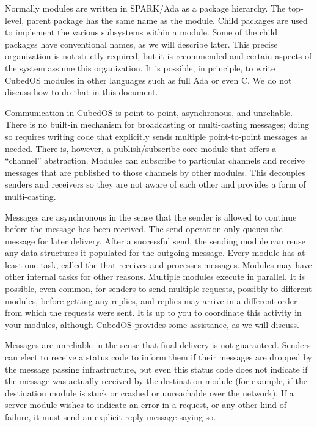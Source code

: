 \documentclass{scrreprt}
\begin{document}
Normally modules are written in SPARK/Ada as a package hierarchy. The top-level, parent package has the same name as the module. Child packages are used to implement the various subsystems within a module. Some of the child packages have conventional names, as we will describe later. This precise organization is not strictly required, but it is recommended and certain aspects of the system assume this organization. It is possible, in principle, to write CubedOS modules in other languages such as full Ada or even C. We do not discuss how to do that in this document.

Communication in CubedOS is point-to-point, asynchronous, and unreliable. There is no built-in mechanism for broadcasting or multi-casting messages; doing so requires writing code that explicitly sends multiple point-to-point messages as needed. There is, however, a publish/subscribe core module that offers a ``channel'' abstraction. Modules can subscribe to particular channels and receive messages that are published to those channels by other modules.  This decouples senders and receivers so they are not aware of each other and provides a form of multi-casting.

Messages are asynchronous in the sense that the sender is allowed to continue before the message has been received. The send operation only queues the message for later delivery. After a successful send, the sending module can reuse any data structures it populated for the outgoing message. Every module has at least one task, called the  that receives and processes messages. Modules may have other internal tasks for other reasons. Multiple modules execute in parallel. It is possible, even common, for senders to send multiple requests, possibly to different modules, before getting any replies, and replies may arrive in a different order from which the requests were sent. It is up to you to coordinate this activity in your modules, although CubedOS provides some assistance, as we will discuss.

Messages are unreliable in the sense that final delivery is not guaranteed. Senders can elect to receive a status code to inform them if their messages are dropped by the message passing infrastructure, but even this status code does not indicate if the message was actually received by the destination module (for example, if the destination module is stuck or crashed or unreachable over the network). If a server module wishes to indicate an error in a request, or any other kind of failure, it must send an explicit reply message saying so.
\end{document}
